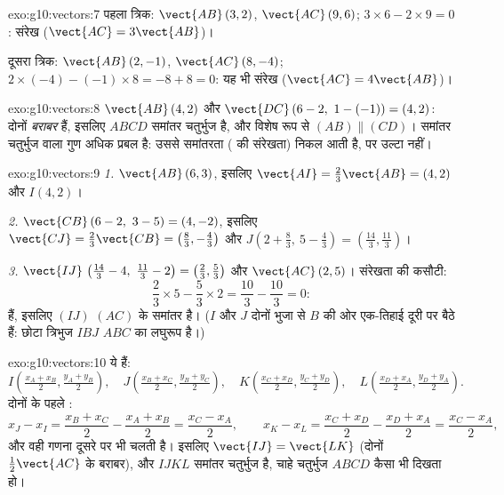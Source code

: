 \begin{solution}{exo:g10:vectors:7}
पहला त्रिक: $\vect{AB}\,(3, 2)$, $\vect{AC}\,(9, 6)$; $3 \times 6 - 2 \times 9 = 0$: संरेख ($\vect{AC} = 3\vect{AB}$)।

दूसरा त्रिक: $\vect{AB}\,(2, -1)$, $\vect{AC}\,(8, -4)$; $2 \times (-4) - (-1) \times 8 = -8 + 8 = 0$: यह भी संरेख ($\vect{AC} = 4\vect{AB}$)।
\end{solution}

\begin{solution}{exo:g10:vectors:8}
$\vect{AB}\,(4, 2)$ और $\vect{DC}\,(6-2,\ 1-(-1)) = (4, 2)$: दोनों  \emph{बराबर} हैं, इसलिए $ABCD$ समांतर चतुर्भुज है,
और विशेष रूप से $(AB) \parallel (CD)$। समांतर चतुर्भुज वाला गुण अधिक प्रबल है: उससे
समांतरता ( की संरेखता) निकल आती है, पर उल्टा नहीं।
\end{solution}

\begin{solution}{exo:g10:vectors:9}
\emph{1.} $\vect{AB}\,(6, 3)$, इसलिए $\vect{AI} = \frac23\vect{AB} = (4, 2)$ और $I(4, 2)$।

\emph{2.} $\vect{CB}\,(6-2,\ 3-5) = (4, -2)$, इसलिए $\vect{CJ} = \frac23\vect{CB} = \left(\frac83, -\frac43\right)$ और $J\left(2 + \frac83,\ 5 - \frac43\right) = \left(\frac{14}{3},
\frac{11}{3}\right)$।

\emph{3.} $\vect{IJ}\,\left(\frac{14}{3} - 4,\ \frac{11}{3} - 2\right) =
\left(\frac23, \frac53\right)$ और $\vect{AC}\,(2, 5)$। संरेखता की कसौटी:
\[
\frac23 \times 5 - \frac53 \times 2 = \frac{10}{3} - \frac{10}{3} = 0 :
\]
  हैं, इसलिए $(IJ)$ $(AC)$ के समांतर है। ($I$ और $J$ दोनों भुजा से
$B$ की ओर एक-तिहाई दूरी पर बैठे हैं: छोटा त्रिभुज $IBJ$ $ABC$ का लघुरूप है।)
\end{solution}

\begin{solution}{exo:g10:vectors:10}
 ये हैं:
\[
I\left(\tfrac{x_A + x_B}{2}, \tfrac{y_A + y_B}{2}\right), \quad
J\left(\tfrac{x_B + x_C}{2}, \tfrac{y_B + y_C}{2}\right), \quad
K\left(\tfrac{x_C + x_D}{2}, \tfrac{y_C + y_D}{2}\right), \quad
L\left(\tfrac{x_D + x_A}{2}, \tfrac{y_D + y_A}{2}\right).
\]
दोनों  के पहले :
\[
x_J - x_I = \frac{x_B + x_C}{2} - \frac{x_A + x_B}{2}
= \frac{x_C - x_A}{2},
\qquad
x_K - x_L = \frac{x_C + x_D}{2} - \frac{x_D + x_A}{2}
= \frac{x_C - x_A}{2},
\]
और वही गणना दूसरे  पर भी चलती है। इसलिए $\vect{IJ} = \vect{LK}$ (दोनों $\frac12\vect{AC}$ के
बराबर), और $IJKL$ समांतर चतुर्भुज है, चाहे चतुर्भुज $ABCD$ कैसा भी दिखता हो।
\end{solution}

